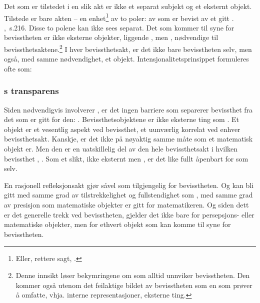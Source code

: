 Det som er tilstedet i en slik akt er ikke et separat subjekt og et 
eksternt objekt. Tilstede er bare akten -- en enhet\footnote{Eller, 
rettere sagt, .} av to poler: av  som er 
bevist av et gitt . 
 \cite{RI},~s.216.
Disse to polene kan ikke sees 
separat. Det som kommer til syne for bevisstheten er ikke eksterne 
objekter, liggende , men 
, n{\o}dvendige  til 
bevissthetsaktene.\footnote{Denne innsikt l{\o}ser bekymringene om 
 som alltid unnviker bevisstheten. Den kommer 
ogs{\aa} utenom det feilaktige bildet av bevisstheten som en 
 som pr{\o}ver {\aa} omfatte, vhja. interne 
representasjoner, eksterne ting.}
I hver bevissthetsakt, er det ikke bare bevisstheten selv, men 
ogs{\aa}, med samme n{\o}dvendighet, et objekt. 
Intensjonalitetsprinsippet formuleres ofte som:
\vspace*{-6ex}
%
\subsubsection{s transparens}
Siden  n{\o}dvendigvis involverer , er det 
ingen barriere som separerer bevisst\-het fra det som er gitt for den: 
 \cite{Id1}.
Bevissthetsobjektene er ikke eksterne ting som . Et 
objekt er et vesentlig aspekt ved bevissthet, et uunv{\ae}rlig 
korrelat ved enhver bevissthetsakt. Kanskje, er det ikke 
 p{\aa} n{\o}yaktig samme m{\aa}te som et matematisk 
objekt er. Men den er en uatskillelig del av den hele bevissthetsakt i 
hvilken bevissthet , . Som et slikt, ikke eksternt men , er 
det like fullt {\aa}penbart for  som  selv.

En rasjonell refleksjonsakt gj{\o}r  s{\aa}vel som 
 tilgjengelig for bevisstheten. Og  kan 
bli gitt med samme grad av tilstrekkelighet og fullstendighet som 
, med samme grad av presisjon som matematiske objekter er 
gitt for matematikeren. Og siden dett er det generelle trekk ved 
bevisstheten, gjelder det ikke bare for persepsjons- eller 
matematiske objekter, men for ethvert objekt som kan komme til syne for 
bevisstheten.

